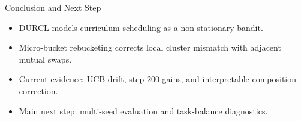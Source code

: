 \documentclass[aspectratio=169]{beamer}
\begin{document}
\begin{frame}{Conclusion and Next Step}
  \begin{itemize}
    \item DURCL models curriculum scheduling as a non-stationary bandit.
    \item Micro-bucket rebucketing corrects local cluster mismatch with adjacent mutual swaps.
    \item Current evidence: UCB drift, step-200 gains, and interpretable composition correction.
    \item Main next step: multi-seed evaluation and task-balance diagnostics.
  \end{itemize}
\end{frame}
\end{document}
